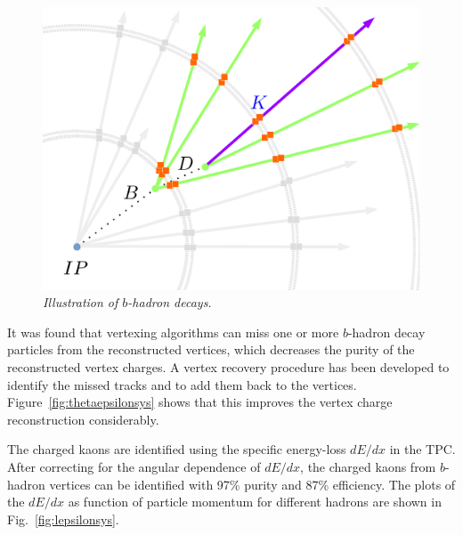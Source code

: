 \documentclass{PoS}
\begin{document}
\begin{figure}
	{\centering
		\includegraphics[width=0.4\linewidth]{../poster/figures/vtx.pdf}
		\caption{\sl Illustration of $b$-hadron decays. }
		\label{fig:vtx}
	}
\end{figure}
It was found that vertexing algorithms can miss one or more $b$-hadron decay particles from the reconstructed vertices, which decreases the purity of the reconstructed vertex charges.
A vertex recovery procedure has been developed to identify the missed tracks and to add them back to the vertices. Figure~\ref{fig:thetaepsilonsys} shows that this improves the vertex charge reconstruction considerably.


The charged kaons are identified using the specific energy-loss
$dE/dx$ in the TPC.
After correcting for the angular dependence of $dE/dx$, the charged kaons from $b$-hadron vertices can be identified with 97\% purity and 87\% efficiency.
The plots of the $dE/dx$ as function of particle momentum for different hadrons are shown in Fig.~\ref{fig:lepsilonsys}.
\end{document}
